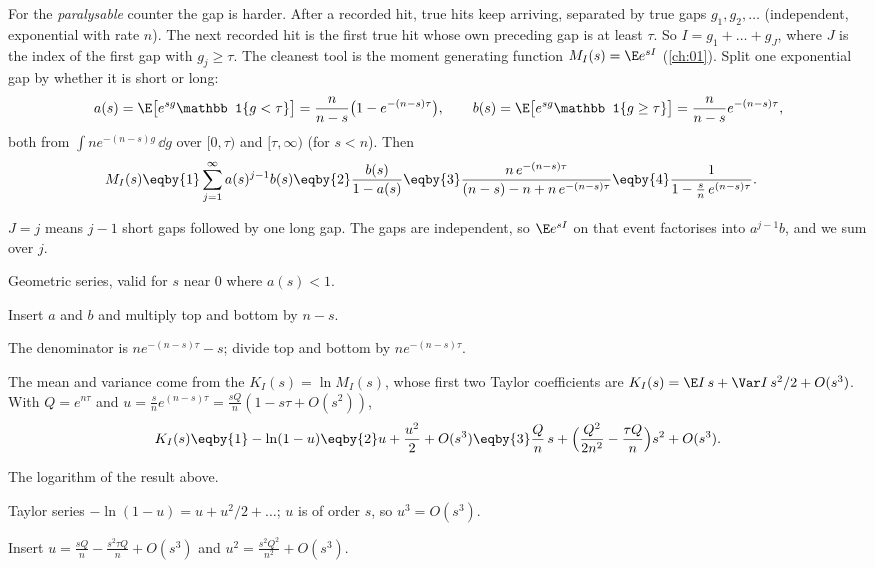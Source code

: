 For the \emph{paralysable} counter the gap is harder. After a recorded hit, true hits keep arriving, separated by true gaps $g_1,g_2,\dots$ (independent, exponential with rate $n$). The next recorded hit is the first true hit whose own preceding gap is at least $\tau$. So $I=g_1+\dots+g_J$, where $J$ is the index of the first gap with $g_j\ge\tau$. The cleanest tool is the moment generating function $M_I(s)=\E e^{sI}$ (\cref{ch:01}). Split one exponential gap by whether it is short or long:
\[
  a(s)=\E\bigl[e^{sg}\mathbb 1\{g<\tau\}\bigr]=\frac{n}{n-s}\bigl(1-e^{-(n-s)\tau}\bigr),\qquad
  b(s)=\E\bigl[e^{sg}\mathbb 1\{g\ge\tau\}\bigr]=\frac{n}{n-s}e^{-(n-s)\tau},
\]
both from $\int n e^{-(n-s)g}\,\dd g$ over $[0,\tau)$ and $[\tau,\infty)$ (for $s<n$). Then
\begin{align*}
  M_I(s)
  &\eqby{1} \sum_{j=1}^\infty a(s)^{j-1}b(s)
  \eqby{2} \frac{b(s)}{1-a(s)}
  \eqby{3} \frac{n\,e^{-(n-s)\tau}}{(n-s)-n+n\,e^{-(n-s)\tau}}
  \eqby{4} \frac{1}{1-\frac{s}{n}\,e^{(n-s)\tau}} .
\end{align*}
\begin{explain}
  \item $J=j$ means $j-1$ short gaps followed by one long gap. The gaps are independent, so $\E e^{sI}$ on that event factorises into $a^{j-1}b$, and we sum over $j$.
  \item Geometric series, valid for $s$ near $0$ where $a(s)<1$.
  \item Insert $a$ and $b$ and multiply top and bottom by $n-s$.
  \item The denominator is $n e^{-(n-s)\tau}-s$; divide top and bottom by $n e^{-(n-s)\tau}$.
\end{explain}
The mean and variance come from the  $K_I(s)=\ln M_I(s)$, whose first two Taylor coefficients are $K_I(s)=\E I\,s+\Var I\,s^2/2+O(s^3)$. With $Q=e^{n\tau}$ and $u=\frac sn e^{(n-s)\tau}=\frac{sQ}{n}(1-s\tau+O(s^2))$,
\begin{align}
  K_I(s) \eqby{1} -\ln(1-u) \eqby{2} u+\frac{u^2}2+O(s^3)
  \eqby{3} \frac{Q}{n}\,s+\Bigl(\frac{Q^2}{2n^2}-\frac{\tau Q}{n}\Bigr)s^2+O(s^3). \label{2a:eq:dtpK}
\end{align}
\begin{explain}
  \item The logarithm of the result above.
  \item Taylor series $-\ln(1-u)=u+u^2/2+\dots$; $u$ is of order $s$, so $u^3=O(s^3)$.
  \item Insert $u=\frac{sQ}n-\frac{s^2\tau Q}{n}+O(s^3)$ and $u^2=\frac{s^2Q^2}{n^2}+O(s^3)$.
\end{explain}
